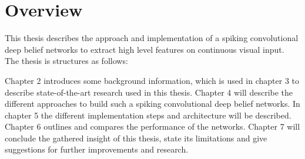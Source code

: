 \section{Overview}

This thesis describes the approach and implementation of a spiking convolutional deep belief networks to extract high level features on continuous visual input. The thesis is structures as follows:

Chapter 2 introduces some background information, which is used in chapter 3 to describe state-of-the-art research used in this thesis. 
Chapter 4 will describe the different approaches to build such a spiking convolutional deep belief networks. 
In chapter 5 the different implementation steps and  architecture will be described. 
Chapter 6 outlines and compares the performance of the networks. 
Chapter 7 will conclude the gathered insight of this thesis, state its limitations and give suggestions for further improvements and research.  